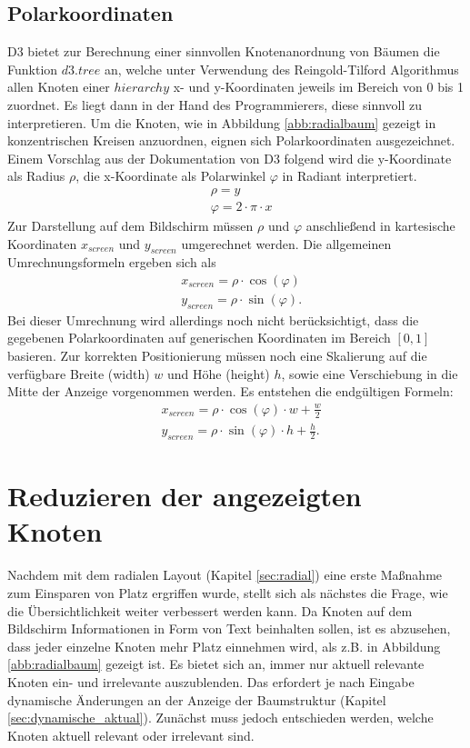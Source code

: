 \subsection{Polarkoordinaten}\label{sec:polarkoordinaten}
D3 bietet zur Berechnung einer sinnvollen Knotenanordnung von Bäumen die Funktion $d3.tree$ an, welche unter Verwendung des Reingold-Tilford Algorithmus  allen Knoten einer $hierarchy$ x- und y-Koordinaten jeweils im Bereich von 0 bis 1 zuordnet. Es liegt dann in der Hand des Programmierers, diese sinnvoll zu interpretieren. Um die Knoten, wie in Abbildung \ref{abb:radialbaum} gezeigt in konzentrischen Kreisen anzuordnen, eignen sich Polarkoordinaten ausgezeichnet. Einem Vorschlag aus der Dokumentation von D3 folgend  wird die y-Koordinate als Radius $\rho$, die x-Koordinate als Polarwinkel $\varphi$ in Radiant interpretiert. 
\begin{align*}
&\rho = y\\
&\varphi = 2 \cdot \pi \cdot x
\end{align*}
Zur Darstellung auf dem Bildschirm müssen $\rho$ und $\varphi$ anschließend in kartesische Koordinaten $x_{screen}$ und $y_{screen}$ umgerechnet werden. Die allgemeinen Umrechnungsformeln ergeben sich als
\begin{align*}
&x_{screen} = \rho \cdot \cos (\varphi)\\
&y_{screen} = \rho \cdot \sin (\varphi).
\end{align*}
Bei dieser Umrechnung wird allerdings noch nicht berücksichtigt, dass die gegebenen Polarkoordinaten auf generischen Koordinaten im Bereich $[0,1]$ basieren. Zur korrekten Positionierung müssen noch eine Skalierung auf die verfügbare Breite (width) $w$ und Höhe (height) $h$, sowie eine Verschiebung in die Mitte der Anzeige vorgenommen werden. Es entstehen die endgültigen Formeln:
\begin{align}
&x_{screen} = \rho \cdot \cos (\varphi) \cdot w + \frac{w}{2} \label{eq:polkarthx}\\
&y_{screen} = \rho \cdot \sin (\varphi) \cdot h + \frac{h}{2}.\label{eq:polkarthy}
\end{align}

\section{Reduzieren der angezeigten Knoten}\label{sec:reduzieren}
Nachdem mit dem radialen Layout (Kapitel \ref{sec:radial}) eine erste Maßnahme zum Einsparen von Platz ergriffen wurde, stellt sich als nächstes die Frage, wie die Übersichtlichkeit weiter verbessert werden kann. Da Knoten auf dem Bildschirm Informationen in Form von Text beinhalten sollen, ist es abzusehen, dass jeder einzelne Knoten mehr Platz einnehmen wird, als z.B. in Abbildung \ref{abb:radialbaum} gezeigt ist. Es bietet sich an, immer nur aktuell relevante Knoten ein- und irrelevante auszublenden. Das erfordert je nach Eingabe dynamische Änderungen an der Anzeige der Baumstruktur (Kapitel \ref{sec:dynamische_aktual}). Zunächst muss jedoch entschieden werden, welche Knoten aktuell relevant oder irrelevant sind. 

